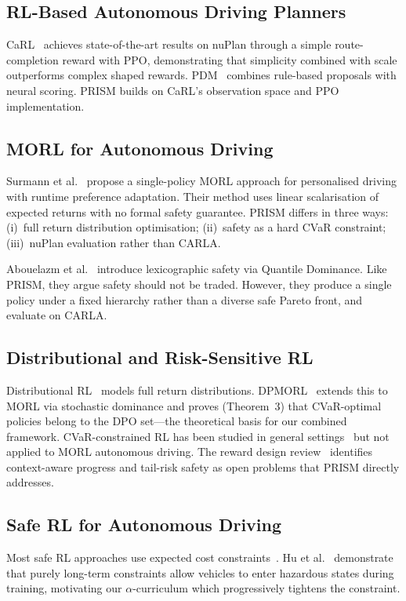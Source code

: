 \documentclass[conference]{IEEEtran}
\begin{document}
\subsection{RL-Based Autonomous Driving Planners}
CaRL~\cite{CaRL2025} achieves state-of-the-art results on nuPlan
through a simple route-completion reward with PPO, demonstrating that
simplicity combined with scale outperforms complex shaped rewards.
PDM~\cite{PDM2023} combines rule-based proposals with neural scoring.
PRISM builds on CaRL's observation space and PPO implementation.

\subsection{MORL for Autonomous Driving}
Surmann et al.~\cite{Surmann2025} propose a single-policy MORL approach
for personalised driving with runtime preference adaptation. Their method
uses linear scalarisation of expected returns with no formal safety
guarantee. PRISM differs in three ways: (i)~full return distribution
optimisation; (ii)~safety as a hard CVaR constraint; (iii)~nuPlan
evaluation rather than CARLA.

Abouelazm et al.~\cite{BeyondScalar2026} introduce lexicographic safety
via Quantile Dominance. Like PRISM, they argue safety should not be
traded. However, they produce a single policy under a fixed hierarchy
rather than a diverse safe Pareto front, and evaluate on CARLA.

\subsection{Distributional and Risk-Sensitive RL}
Distributional RL~\cite{C51_2017,QRDQN2018} models full return
distributions. DPMORL~\cite{DPMORL2023} extends this to MORL via
stochastic dominance and proves (Theorem~3) that CVaR-optimal policies
belong to the DPO set---the theoretical basis for our combined
framework. CVaR-constrained RL has been studied in general
settings~\cite{CVaRCPO2024,CPPO2022,TRC2022} but not applied to MORL
autonomous driving. The reward design review~\cite{RewardReview2024}
identifies context-aware progress and tail-risk safety as open problems
that PRISM directly addresses.

\subsection{Safe RL for Autonomous Driving}
Most safe RL approaches use expected cost
constraints~\cite{CPO2017,Tessler2018}. Hu et al.~\cite{LSTC2024}
demonstrate that purely long-term constraints allow vehicles to enter
hazardous states during training, motivating our $\alpha$-curriculum
which progressively tightens the constraint.
\end{document}
